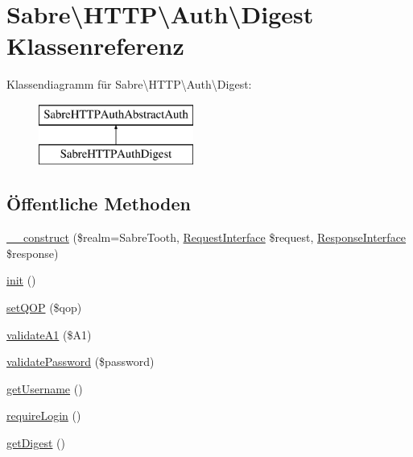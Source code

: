 \hypertarget{class_sabre_1_1_h_t_t_p_1_1_auth_1_1_digest}{}\section{Sabre\textbackslash{}H\+T\+TP\textbackslash{}Auth\textbackslash{}Digest Klassenreferenz}
\label{class_sabre_1_1_h_t_t_p_1_1_auth_1_1_digest}
Klassendiagramm für Sabre\textbackslash{}H\+T\+TP\textbackslash{}Auth\textbackslash{}Digest\+:\begin{figure}[H]
\begin{center}
\leavevmode
\includegraphics[height=2.000000cm]{class_sabre_1_1_h_t_t_p_1_1_auth_1_1_digest}
\end{center}
\end{figure}
\subsection*{Öffentliche Methoden}
\begin{DoxyCompactItemize}
\item 
\mbox{\hyperlink{class_sabre_1_1_h_t_t_p_1_1_auth_1_1_digest_af86154e7d1c3ee6d78eaf7b9bfdd9e7c}{\+\_\+\+\_\+construct}} (\$realm=\textquotesingle{}Sabre\+Tooth\textquotesingle{}, \mbox{\hyperlink{interface_sabre_1_1_h_t_t_p_1_1_request_interface}{Request\+Interface}} \$request, \mbox{\hyperlink{interface_sabre_1_1_h_t_t_p_1_1_response_interface}{Response\+Interface}} \$response)
\item 
\mbox{\hyperlink{class_sabre_1_1_h_t_t_p_1_1_auth_1_1_digest_ab728a5988c652dadc47058f99eccaefd}{init}} ()
\item 
\mbox{\hyperlink{class_sabre_1_1_h_t_t_p_1_1_auth_1_1_digest_a11ee647072118c6062f8f8b59e61f981}{set\+Q\+OP}} (\$qop)
\item 
\mbox{\hyperlink{class_sabre_1_1_h_t_t_p_1_1_auth_1_1_digest_a5598d7b0be03b258c592384cb00aa26b}{validate\+A1}} (\$A1)
\item 
\mbox{\hyperlink{class_sabre_1_1_h_t_t_p_1_1_auth_1_1_digest_a4bc25689fa17ba401cab58832cc62c25}{validate\+Password}} (\$password)
\item 
\mbox{\hyperlink{class_sabre_1_1_h_t_t_p_1_1_auth_1_1_digest_aac357fbd44dec1343d672e2514af677d}{get\+Username}} ()
\item 
\mbox{\hyperlink{class_sabre_1_1_h_t_t_p_1_1_auth_1_1_digest_aedfbedd45800cddf8528fee9a017561f}{require\+Login}} ()
\item 
\mbox{\hyperlink{class_sabre_1_1_h_t_t_p_1_1_auth_1_1_digest_af76d324b665e0ae32491d2e1b65a433b}{get\+Digest}} ()
\end{DoxyCompactItemize}
